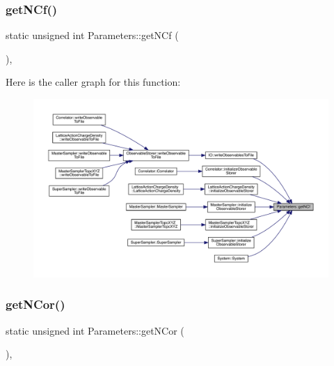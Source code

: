 \subsubsection{\texorpdfstring{getNCf()}{getNCf()}}
{\footnotesize\ttfamily static unsigned int Parameters\+::get\+N\+Cf (\begin{DoxyParamCaption}{ }\end{DoxyParamCaption})\hspace{0.3cm}{\ttfamily [inline]}, {\ttfamily [static]}}

Here is the caller graph for this function\+:
\nopagebreak
\begin{figure}[H]
\begin{center}
\leavevmode
\includegraphics[width=350pt]{class_parameters_a03f8c0aa2a31b9bfc016441cb263082c_icgraph}
\end{center}
\end{figure}
\mbox{\label{class_parameters_a0fd902d5efcd8dce17dbc3ea4177820d}} 
\subsubsection{\texorpdfstring{getNCor()}{getNCor()}}
{\footnotesize\ttfamily static unsigned int Parameters\+::get\+N\+Cor (\begin{DoxyParamCaption}{ }\end{DoxyParamCaption})\hspace{0.3cm}{\ttfamily [inline]}, {\ttfamily [static]}}

